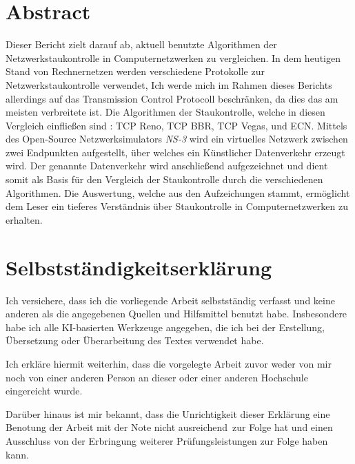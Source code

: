 \documentclass[paper=a4,fontsize=12pt,ngerman]{scrartcl}
\begin{document}
\pagestyle{plain}



\section*{Abstract}



Dieser Bericht zielt darauf ab, aktuell benutzte Algorithmen der Netzwerkstaukontrolle in Computernetzwerken zu vergleichen.
In dem heutigen Stand von Rechnernetzen werden verschiedene Protokolle zur Netzwerkstaukontrolle verwendet, 
Ich werde mich im Rahmen dieses Berichts allerdings auf das Transmission Control Protocoll beschränken, da dies das am meisten verbreitete ist.  \newline
Die Algorithmen der Staukontrolle, welche in diesen Vergleich einfließen sind : TCP Reno, TCP BBR, TCP Vegas, und ECN.
\newline
Mittels des Open-Source Netzwerksimulators \textit{NS-3} wird ein virtuelles Netzwerk zwischen zwei Endpunkten aufgestellt, über
welches ein Künstlicher Datenverkehr erzeugt wird.
Der genannte Datenverkehr wird anschließend aufgezeichnet und dient somit als Basis für den Vergleich der Staukontrolle durch 
die verschiedenen Algorithmen.
Die Auswertung, welche aus den Aufzeichungen stammt, ermöglicht dem Leser ein tieferes Verständnis über Staukontrolle in Computernetzwerken
zu erhalten. 




\newpage
\section*{Selbstständigkeitserklärung}
Ich versichere, dass ich die vorliegende Arbeit selbstständig verfasst und 
keine anderen als die angegebenen Quellen und Hilfsmittel benutzt habe.
Insbesondere habe ich alle KI-basierten Werkzeuge angegeben, die ich bei
der Erstellung, Übersetzung oder Überarbeitung des Textes verwendet habe.

Ich erkläre hiermit weiterhin, dass die vorgelegte Arbeit zuvor weder von mir 
noch von einer anderen Person an dieser oder einer anderen Hochschule 
eingereicht wurde.

Darüber hinaus ist mir bekannt, dass die Unrichtigkeit dieser Erklärung eine 
Benotung der Arbeit mit der Note \glqq nicht ausreichend\grqq \ zur Folge hat 
und einen Ausschluss von der Erbringung weiterer Prüfungsleistungen zur Folge 
haben kann.
\bigskip
 
\end{document}
